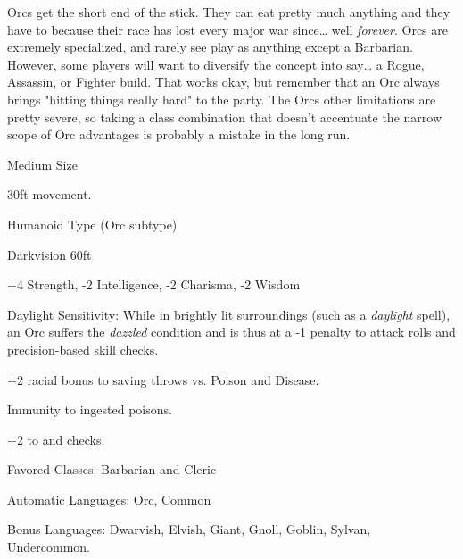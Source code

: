 
Orcs get the short end of the stick. They can eat pretty much anything and they have to because their race has lost every major war since\ldots{} well \textit{forever}. Orcs are extremely specialized, and rarely see play as anything except a Barbarian. However, some players will want to diversify the concept into say\ldots{} a Rogue, Assassin, or Fighter build. That works okay, but remember that an Orc always brings "hitting things really hard" to the party. The Orcs other limitations are pretty severe, so taking a class combination that doesn't accentuate the narrow scope of Orc advantages is probably a mistake in the long run.

\begin{itemize*}
\item Medium Size
\item 30ft movement.
\item Humanoid Type (Orc subtype)
\item Darkvision 60ft
\item +4 Strength, -2 Intelligence, -2 Charisma, -2 Wisdom
\item Daylight Sensitivity: While in brightly lit surroundings (such as a \textit{daylight} 
spell), an Orc suffers the \textit{dazzled} condition and is thus at a -1 penalty 
to attack rolls and precision-based skill checks.
\item +2 racial bonus to saving throws vs. Poison and Disease.
\item Immunity to ingested poisons.
\item +2 to  and  checks.
\item Favored Classes: Barbarian and Cleric
\item Automatic Languages: Orc, Common
\item Bonus Languages: Dwarvish, Elvish, Giant, Gnoll, Goblin, Sylvan, Undercommon.
\end{itemize*}
